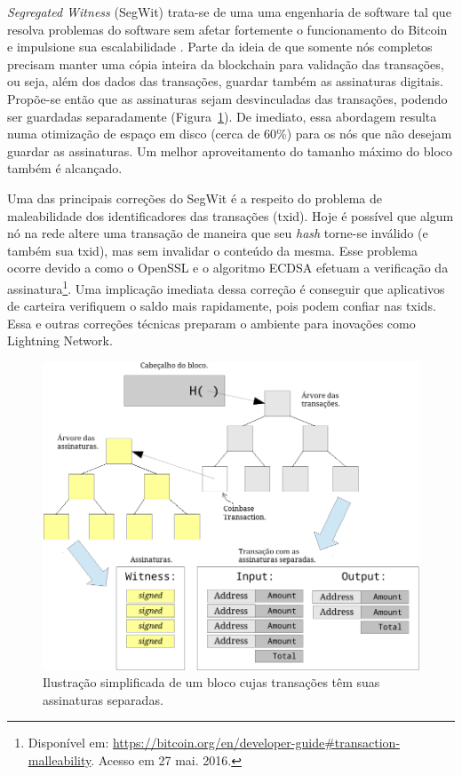 \textit{Segregated Witness} (SegWit) trata-se de uma uma engenharia de software tal que resolva problemas do software sem afetar fortemente o funcionamento do Bitcoin e impulsione sua escalabilidade \cite{bib:segwit}. Parte da ideia de que somente nós completos precisam manter uma cópia inteira da blockchain para validação das transações, ou seja, além dos dados das transações, guardar também as assinaturas digitais. Propõe-se então que as assinaturas sejam desvinculadas das transações, podendo ser guardadas separadamente (Figura~\ref{fig:witness}). De imediato, essa abordagem resulta numa otimização de espaço em disco (cerca de 60\%) para os nós que não desejam guardar as assinaturas. Um melhor aproveitamento do tamanho máximo do bloco também é alcançado.

Uma das principais correções do SegWit é a respeito do problema de maleabilidade dos identificadores das transações (txid). Hoje é possível que algum nó na rede altere uma transação de maneira que seu \textit{hash} torne-se inválido (e também sua txid), mas sem invalidar o conteúdo da mesma. Esse problema ocorre devido a como o OpenSSL e o algoritmo ECDSA efetuam a verificação da assinatura\footnote{Disponível em: \url{https://bitcoin.org/en/developer-guide\#transaction-malleability}. Acesso em 27 mai. 2016.}. Uma implicação imediata dessa correção é conseguir que aplicativos de carteira verifiquem o saldo mais rapidamente, pois podem confiar nas txids. Essa e outras correções técnicas preparam o ambiente para inovações como Lightning Network.

\begin{figure}[h!]
	\centering
	\includegraphics[scale=0.95]{./images/witness.pdf}
	\caption{Ilustração simplificada de um bloco cujas transações têm suas assinaturas separadas. \label{fig:witness}}
\end{figure}

